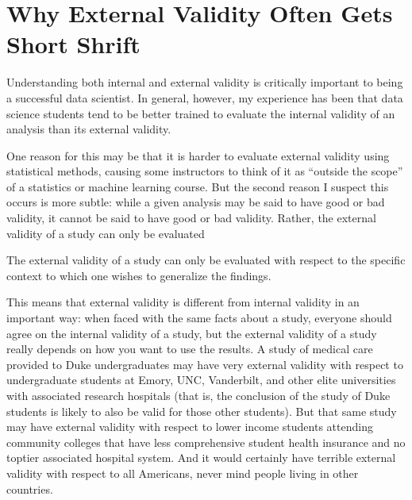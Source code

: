 \documentclass[letterpaper,10pt,english]{jupyterBook}
\begin{document}
\section{Why External Validity Often Gets Short Shrift}
\label{\detokenize{30_questions/15_answering_exploratory_questions:why-external-validity-often-gets-short-shrift}}
\sphinxAtStartPar
Understanding both internal and external validity is critically important to being a successful data scientist. In general, however, my experience has been that data science students tend to be better trained to evaluate the internal validity of an analysis than its external validity.

\sphinxAtStartPar
One reason for this may be that it is harder to evaluate external validity using statistical methods, causing some instructors to think of it as “outside the scope” of a statistics or machine learning course. But the second reason I suspect this occurs is more subtle: while a given analysis may be said to have good or bad  validity, it cannot be said to have good or bad  validity. Rather, the external validity of a study can only be evaluated 

\begin{sphinxShadowBox}

\sphinxAtStartPar
The external validity of a study can only be evaluated with respect to the specific context to which one wishes to generalize the findings.
\end{sphinxShadowBox}

\sphinxAtStartPar
This means that external validity is different from internal validity in an important way: when faced with the same facts about a study, everyone should  agree on the internal validity of a study, but the external validity of a study really depends on how you want to use the results. A study of medical care provided to Duke undergraduates may have very  external validity with respect to undergraduate students at Emory, UNC, Vanderbilt, and other elite universities with associated research hospitals (that is, the conclusion of the study of Duke students is likely to also be valid for those other students). But that same study may have  external validity with respect to lower income students attending community colleges that have less comprehensive student health insurance and no top\sphinxhyphen{}tier associated hospital system. And it would certainly have terrible external validity with respect to all Americans, never mind people living in other countries.
\end{document}
